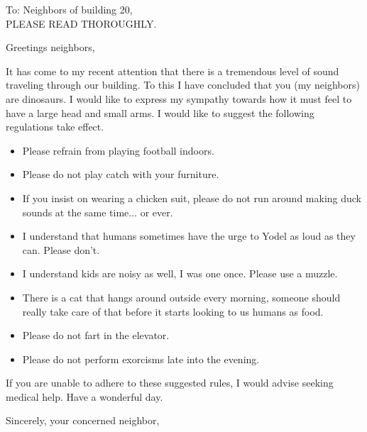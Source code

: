 \documentclass[]{letter}
\begin{document}
	
	\begin{letter}{To: Neighbors of building 20,\\ PLEASE READ THOROUGHLY.}
		\address{STREET ADDRESS\\ ADDRESS LINE 2\\ CITY, STATE, ZIP-CODE}
		
		\opening{Greetings neighbors,}
		
		It has come to my recent attention that there is a tremendous level of sound traveling through our building. To this I have concluded that you (my neighbors) are dinosaurs. I would like to express my sympathy towards how it must feel to have a large head and small arms. I would like to suggest the following regulations take effect.
		\begin{itemize}
			\item Please refrain from playing football indoors.
			\item Please do not play catch with your furniture.
			\item If you insist on wearing a chicken suit, please do not run around making duck sounds at the same time... or ever.
			\item I understand that humans sometimes have the urge to Yodel as loud as they can. Please don't.
			\item I understand kids are noisy as well, I was one once. Please use a muzzle.
			\item There is a cat that hangs around outside every morning, someone should really take care of that before it starts looking to us humans as food.
			\item Please do not fart in the elevator.
			\item Please do not perform exorcisms late into the evening.
		\end{itemize}
		If you are unable to adhere to these suggested rules, I would advise seeking medical help. Have a wonderful day.
		\signature{Neighbor}
		
		\closing{Sincerely, your concerned neighbor,}
		
		
	\end{letter}
\end{document}
